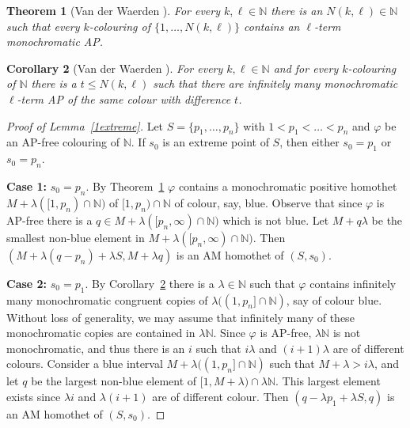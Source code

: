 \documentclass[12pt]{article}
\newcommand{\N}{{\mathbb N}}
\theoremstyle{plain}
\newtheorem{theorem}{Theorem}
\newtheorem{corollary}[theorem]{Corollary}
\theoremstyle{definition}
\begin{document}
\begin{theorem}[Van der Waerden \cite{vdW}]\label{vdWoriginal}
For every $k,\ell\in \mathbb{N}$ there is an $N(k,\ell)\in \mathbb{N}$ such that every $k$-colouring of $\{1,\ldots,N(k,\ell)\}$ contains an $\ell$-term monochromatic AP.
\end{theorem}

\begin{corollary}[Van der Waerden \cite{vdW}]\label{vdW}
For every $k,\ell\in \mathbb{N}$ and for every $k$-colouring of $\N$ there is a $t\le N(k,\ell)$ such that there are infinitely many monochromatic $\ell$-term AP of the same colour with difference $t$. 
\end{corollary} 




\begin{proof}[Proof of Lemma~\ref{1extreme}]
Let $S=\{p_1,\dots,p_n\}$ with $1< p_1< \dots < p_n$ and $\varphi$ be an AP-free colouring of $\mathbb{N}$.
If $s_0$ is an extreme point of $S$, then either $s_0=p_1$ or $s_0=p_n$.

\medskip

\textbf{Case 1:} $s_0=p_n$. By Theorem~\ref{vdWoriginal} $\varphi$ contains a monochromatic positive homothet \mbox{$M+\lambda([1,p_n)\cap \N)$} of $[1,p_n)\cap \N$ of colour, say, blue. Observe that since $\varphi$ is AP-free there is a \mbox{$q\in M+\lambda ([p_n,\infty)\cap \mathbb{N})$} which is not blue. Let $M+q\lambda$ be the smallest non-blue element in $M+\lambda([p_n,\infty)\cap \mathbb{N})$. Then $(M+\lambda(q-p_n)+\lambda S,M+\lambda q)$ is an AM homothet of $(S,s_0)$.
	
	\medskip

\textbf{Case 2:} $s_0=p_1$. By Corollary~\ref{vdW}  there is a $\lambda \in \mathbb{N}$ such that $\varphi$ contains infinitely many monochromatic congruent copies of $\lambda ((1,p_n]\cap \N)$, say of colour blue.
Without loss of generality, we may assume that infinitely many of these monochromatic copies are contained in $\lambda \N$.
Since $\varphi$ is AP-free, $\lambda \N$ is not monochromatic,  and thus there is an $i$ such that $i\lambda$ and $(i+1)\lambda$ are of different colours. 
Consider a blue interval $M+\lambda ((1,p_n]\cap \N)$  such that $M+\lambda>i\lambda$, and let $q$ be the largest non-blue element of $[1,M+\lambda)\cap \lambda \N$. This largest element exists since $\lambda i$ and $\lambda (i+1)$ are of different colour. Then $(q-\lambda p_1+\lambda S,q)$ is an AM homothet of $(S,s_0)$. 
\end{proof}
\end{document}
